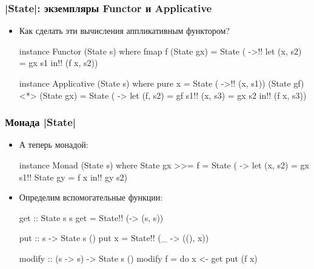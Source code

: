 \documentclass[11pt]{beamer}
\begin{document}
\begin{frame}[fragile]
  \frametitle{\haskinline|State|: экземпляры Functor и Applicative}
  \begin{itemize}
    \item Как сделать эти вычисления аппликативным функтором?
          \begin{haskellsmall}
            instance Functor (State s) where
              fmap f (State gx) = State ( ->!\pause!
                let (x, s2) = gx s1
                in!\pause! (f x, s2))

            instance Applicative (State s) where
              pure x = State ( ->!\pause! (x, s1))
              (State gf) <*> (State gx) = State ( ->
                let (f, s2) = gf s1!\pause!
                    (x, s3) = gx s2
                in!\pause! (f x, s3))
          \end{haskellsmall}
  \end{itemize}
\end{frame}

\begin{frame}[fragile]
  \frametitle{Монада \haskinline|State|}
  \begin{itemize}
    \item А теперь монадой:
          \begin{haskellsmall}
            instance Monad (State s) where
              State gx >>= f = State ( ->
                let (x, s2) = gx s1!\pause!
                    State gy = f x
                in!\pause! gy s2)
          \end{haskellsmall}
          \pause
    \item Определим вспомогательные функции:
          \begin{haskellsmall}
            get :: State s s
            get = State!\pause! (\s -> (s, s))

            put :: s -> State s ()
            put x = State!\pause! (\_ -> ((), x))

            modify :: (s -> s) -> State s ()
            modify f = do x <- get
                          put (f x)
          \end{haskellsmall}
  \end{itemize}
\end{frame}
\end{document}
